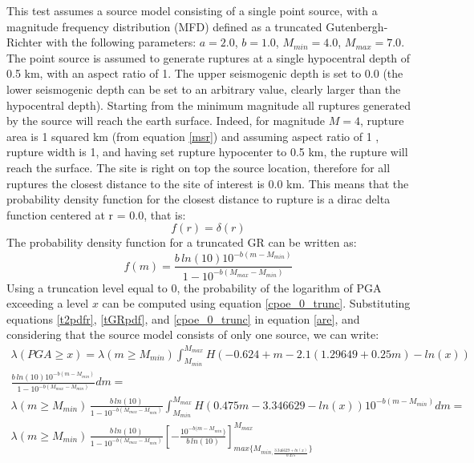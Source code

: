 This test assumes a source model consisting of a single point source, 
with a magnitude frequency distribution (MFD)
defined as a truncated Gutenbergh-Richter with the following parameters:
$a=2.0$, $b=1.0$, $M_{min}=4.0$, $M_{max}=7.0$.
The point source is assumed to generate ruptures at a single hypocentral depth
of 0.5 km, with an aspect ratio of 1.  The upper seismogenic depth is set to 0.0
(the lower seismogenic depth can be set to an arbitrary value, clearly larger
than the hypocentral depth).
%
Starting from the minimum magnitude all ruptures generated by the source will
reach the earth surface.  Indeed, for magnitude $M=4$, rupture area is 1 squared
km (from equation \ref{msr}) and assuming aspect ratio of 1 , rupture width is
1, and having set rupture hypocenter to 0.5 km, the rupture will reach the
surface. The site is right on top the source location, therefore for
all ruptures the closest distance to the site of interest is 0.0 km. 
%
This means that the probability density function for the closest distance to
rupture is a dirac delta function centered at r = 0.0, that is:
\begin{equation}
\label{t2pdfr}
f(r) = \delta(r)
\end{equation}
The probability density function for a truncated GR can be written as:
\begin{equation}
\label{tGRpdf}
f(m) = \frac{b \,ln(10) 10^{-b(m-M_{min})}}{1 - 10^{-b(M_{max} - M_{min})}}
\end{equation}
Using a truncation level equal to 0, the probability of the logarithm of PGA
exceeding a level $x$ can be computed using equation \ref{cpoe_0_trunc}.
Substituting equations \ref{t2pdfr}, \ref{tGRpdf}, and \ref{cpoe_0_trunc} in
equation \ref{are}, and considering that the source model consists of only one
source, we can write:
\begin{eqnarray}
    \label{aret2}
    \lambda(PGA \geq x) =  \lambda(m\geq M_{min}) \int_{M_{min}}^{M_{max}} H(-0.624 + m - 2.1 (1.29649 + 0.25 m) - ln(x)) \nonumber \\
    \frac{b \,ln(10) 10^{-b(m-M_{min})}}{1 - 10^{-b(M_{max} - M_{min})}} dm =\nonumber \\
     \lambda(m\geq M_{min})\, \frac{b \,ln(10)}{1 - 10^{-b(M_{max} - M_{min})}} \int_{M_{min}}^{M_{max}} H(0.475m - 3.346629 - ln(x)) 10^{-b(m-M_{min})} dm =\nonumber \\
      \lambda(m\geq M_{min})\, \frac{b \,ln(10)}{1 - 10^{-b(M_{max} - M_{min})}} \left[ -\frac{10^{-b(m - M_{min}})}{b\,ln(10)} \right]_{max\{ M_{min, \frac{3.346629 + ln(x)}{0.475}} \}}^{M_{max}}
\end{eqnarray}
